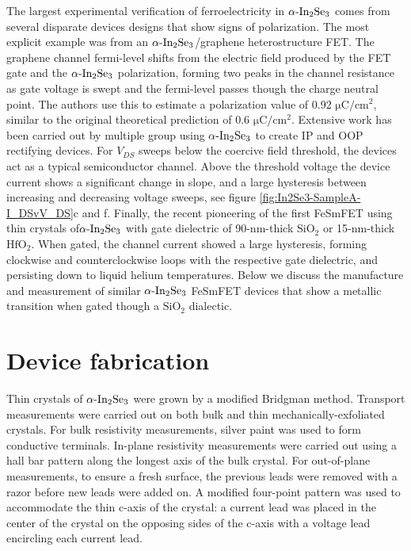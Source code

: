 The largest experimental verification of ferroelectricity in $\textrm{\ensuremath{\alpha}-In}_{2}\textrm{Se}_{3}$
comes from several disparate devices designs that show signs of polarization.
The most explicit example was from an $\textrm{\ensuremath{\alpha}-In}_{2}\textrm{Se}_{3}$/graphene
heterostructure FET. The graphene channel fermi-level shifts from
the electric field produced by the FET gate and the $\textrm{\ensuremath{\alpha}-In}_{2}\textrm{Se}_{3}$
polarization, forming two peaks in the channel resistance as gate
voltage is swept and the fermi-level passes though the charge neutral
point.\citep{wan2019nonvolatile} The authors use this to estimate
a polarization value of 0.92 $\mathrm{\mu C/cm^{2}}$, similar to
the original theoretical prediction of 0.6 $\mathrm{\mu C/cm^{2}}$\citep{ding2017prediction}.
Extensive work has been carried out by multiple group using $\textrm{\ensuremath{\alpha}-In}_{2}\textrm{Se}_{3}$
to create IP\citep{dai2020intrinsic,cui2018intercorrelated,hou2019resistive}
and OOP\citep{wan2018roomtemperature,yang2019nonvolatile} rectifying
devices. For $V_{DS}$ sweeps below the coercive field threshold,
the devices act as a typical semiconductor channel. Above the threshold
voltage the device current shows a significant change in slope, and
a large hysteresis between increasing and decreasing voltage sweeps,
see figure \ref{fig:In2Se3-SampleA-I_DSvV_DS}c and f. Finally, the
recent pioneering of the first FeSmFET using thin crystals of$\textrm{\ensuremath{\alpha}-In}_{2}\textrm{Se}_{3}$
with gate dielectric of 90-nm-thick $\mathrm{SiO_{2}}$ or 15-nm-thick
$\mathrm{HfO_{2}}$. When gated, the channel current showed a large
hysteresis, forming clockwise and counterclockwise loops with the
respective gate dielectric, and persisting down to liquid helium temperatures.\citep{si2019ferroelectric}
Below we discuss the manufacture and measurement of similar $\textrm{\ensuremath{\alpha}-In}_{2}\textrm{Se}_{3}$
FeSmFET devices that show a metallic transition when gated though
a $\mathrm{SiO_{2}}$ dialectic.

\section{Device fabrication}

Thin crystals of $\textrm{\ensuremath{\alpha}-In}_{2}\textrm{Se}_{3}$
were grown by a modified Bridgman method. Transport measurements were
carried out on both bulk and thin mechanically-exfoliated crystals.
For bulk resistivity measurements, silver paint was used to form conductive
terminals. In-plane resistivity measurements were carried out using
a hall bar pattern along the longest axis of the bulk crystal. For
out-of-plane measurements, to ensure a fresh surface, the previous
leads were removed with a razor before new leads were added on. A
modified four-point pattern was used to accommodate the thin c-axis
of the crystal: a current lead was placed in the center of the crystal
on the opposing sides of the c-axis with a voltage lead encircling
each current lead. 

